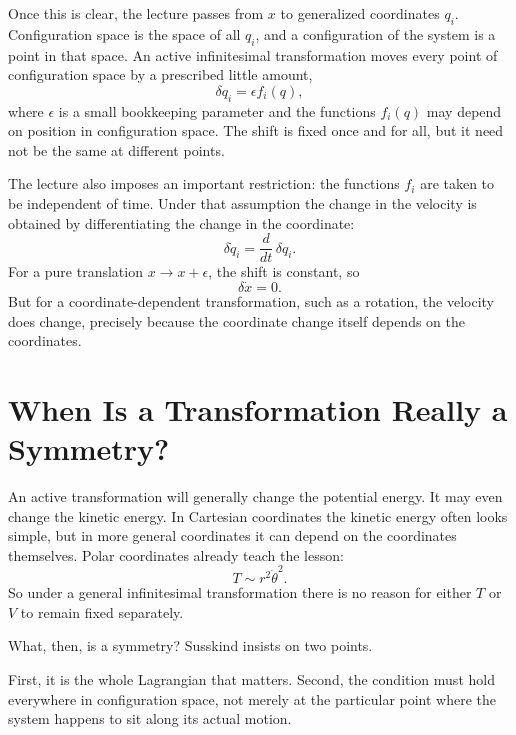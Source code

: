 Once this is clear, the lecture passes from \(x\) to generalized coordinates \(q_i\). Configuration space is the space of all \(q_i\), and a configuration of the system is a point in that space. An active infinitesimal transformation moves every point of configuration space by a prescribed little amount,
\begin{equation}
\delta q_i=\epsilon f_i(q),
\end{equation}
where \(\epsilon\) is a small bookkeeping parameter and the functions \(f_i(q)\) may depend on position in configuration space. The shift is fixed once and for all, but it need not be the same at different points.

The lecture also imposes an important restriction: the functions \(f_i\) are taken to be independent of time. Under that assumption the change in the velocity is obtained by differentiating the change in the coordinate:
\begin{equation}
\delta \dot q_i=\frac{d}{dt}\,\delta q_i.
\end{equation}
For a pure translation \(x\to x+\epsilon\), the shift is constant, so
\begin{equation}
\delta \dot x=0.
\end{equation}
But for a coordinate-dependent transformation, such as a rotation, the velocity does change, precisely because the coordinate change itself depends on the coordinates.

\section{When Is a Transformation Really a Symmetry?}

An active transformation will generally change the potential energy. It may even change the kinetic energy. In Cartesian coordinates the kinetic energy often looks simple, but in more general coordinates it can depend on the coordinates themselves. Polar coordinates already teach the lesson:
\[
T \sim r^2 \dot\theta^2.
\]
So under a general infinitesimal transformation there is no reason for either \(T\) or \(V\) to remain fixed separately.

What, then, is a symmetry? Susskind insists on two points.

First, it is the whole Lagrangian that matters. Second, the condition must hold everywhere in configuration space, not merely at the particular point where the system happens to sit along its actual motion.

